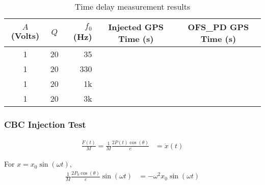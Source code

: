 \begin{table}[htbp]
   \centering
   \begin{tabular}{ ccrcc } %
      \toprule
      $A$ (Volts) & $Q$    & $f_0$ (Hz) & Injected GPS Time (s) & OFS\_PD GPS Time (s) \\
      \midrule
        1 & 20 & 35   &   &\\
        1 & 20 & 330  &   &\\
        1 & 20 & 1k   &   &\\
        1 & 20 & 3k   &   &\\
      \bottomrule
   \end{tabular}
   \caption{Time delay measurement results}
   \label{tab:timedelay}
\end{table}




\pagebreak
\subsubsection{CBC Injection Test}


\begin{align}
    \frac{F(t)}{M}=\frac{1}{M} \frac{2 P(t) \cos(\theta)}{c} &= \ddot{x}(t)
\end{align}

For $x=x_0 \sin(\omega t)$,
\begin{align}
    \frac{1}{M} \frac{2 P_0 \cos(\theta)}{c} \sin(\omega t) &=  -\omega^2 x_0 \sin(\omega t)
\end{align}

